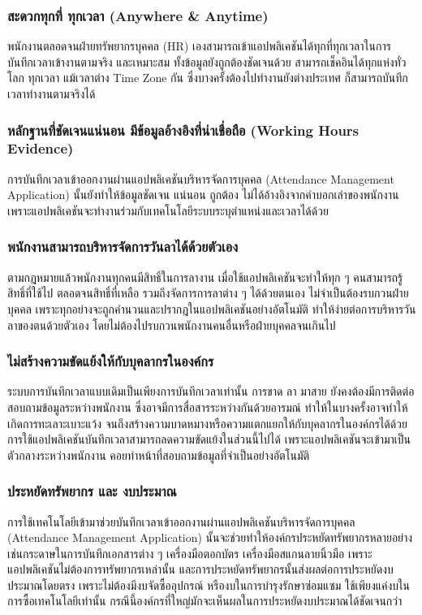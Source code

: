 \subsubsection{สะดวกทุกที่ ทุกเวลา (Anywhere \& Anytime)}
\quad พนักงานตลอดจนฝ่ายทรัพยากรบุคคล (HR) เองสามารถเข้าแอปพลิเคชันได้ทุกที่ทุกเวลาในการบันทึกเวลาเข้างานตามจริง และเหมาะสม
ทั้งข้อมูลยังถูกต้องชัดเจนด้วย สามารถเช็คอินได้ทุกแห่งทั่วโลก ทุกเวลา แม้เวลาต่าง Time Zone กัน ซึ่งบางครั้งต้องไปทำงานยังต่างประเทศ
ก็สามารถบันทึกเวลาทำงานตามจริงได้ 
\subsubsection{หลักฐานที่ชัดเจนแน่นอน มีข้อมูลอ้างอิงที่น่าเชื่อถือ (Working Hours Evidence)}
\quad การบันทึกเวลาเข้าออกงานผ่านแอปพลิเคชันบริหารจัดการบุคคล (Attendance Management Application) 
นั้นยังทำให้ข้อมูลชัดเจน แน่นอน ถูกต้อง ไม่ได้อ้างอิงจากคำบอกเล่าของพนักงาน เพราะแอปพลิเคชันจะทำงานร่วมกับเทคโนโลยีระบบระบุตำแหน่งและเวลาได้ด้วย
\subsubsection{พนักงานสามารถบริหารจัดการวันลาได้ด้วยตัวเอง}
\quad ตามกฎหมายแล้วพนักงานทุกคนมีสิทธิ์ในการลางาน เมื่อใช้แอปพลิเคชันจะทำให้ทุก ๆ คนสามารถรู้สิทธิ์ที่ใช้ไป ตลอดจนสิทธิ์ที่เหลือ 
รวมถึงจัดการการลาต่าง ๆ ได้ด้วยตนเอง ไม่จำเป็นต้องรบกวนฝ่ายบุคคล เพราะทุกอย่างจะถูกคำนวนและปรากฎในแอปพลิเคชันอย่างอัตโนมัติ 
ทำให้ง่ายต่อการบริหารวันลาของตนด้วยตัวเอง โดยไม่ต้องไปรบกวนพนักงานคนอื่นหรือฝ่ายบุคคลจนเกินไป 
\subsubsection{ไม่สร้างความขัดแย้งให้กับบุคลากรในองค์กร}  
\quad ระบบการบันทึกเวลาแบบเดิมเป็นเพียงการบันทึกเวลาเท่านั้น การขาด ลา มาสาย ยังคงต้องมีการติดต่อสอบถามข้อมูลระหว่างพนักงาน 
ซึ่งอาจมีการสื่อสารระหว่างกันด้วยอารมณ์ ทำให้ในบางครั้งอาจทำให้เกิดการทะเลาะเบาะแว้ง จนถึงสร้างความบาดหมางหรือความแตกแยกให้กับบุคลากรในองค์กรได้ด้วย 
การใช้แอปพลิเคชันบันทึกเวลาสามารถลดความขัดแย้งในส่วนนี้ไปได้ เพราะแอปพลิเคชันจะเข้ามาเป็นตัวกลางระหว่างพนักงาน คอยทำหน้าที่สอบถามข้อมูลที่จำเป็นอย่างอัตโนมัติ
\subsubsection{ประหยัดทรัพยากร และ งบประมาณ}
\quad การใช้เทคโนโลยีเข้ามาช่วยบันทึกเวลาเข้าออกงานผ่านแอปพลิเคชันบริหารจัดการบุคคล (Attendance Management Application) 
นั้นจะช่วยทำให้องค์กรประหยัดทรัพยากรหลายอย่าง เช่นกระดาษในการบันทึกเอกสารต่าง ๆ เครื่องมือตอกบัตร เครื่องมือสแกนลายนิ้วมือ เพราะแอปพลิเคชันไม่ต้องการทรัพยากรเหล่านั้น 
และการประหยัดทรัพยากรนั้นส่งผลต่อการประหยัดงบประมาณโดยตรง เพราะไม่ต้องมีงบจัดซื้ออุปกรณ์ หรืองบในการบำรุงรักษาซ่อมแซม ใช้เพียงแค่งบในการซื้อเทคโนโลยีเท่านั้น 
กรณีนี้องค์กรที่ใหญ่มักจะเห็นผลในการประหยัดงบประมาณได้ชัดเจนกว่า 
